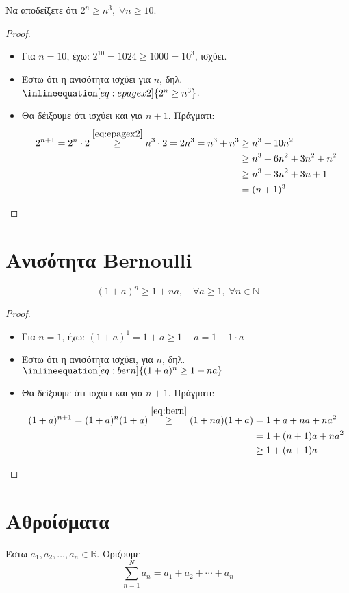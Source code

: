 \documentclass[main.tex]{subfiles}
\begin{document}
\begin{example}
    Να αποδείξετε ότι $ 2^{n} \geq n^{3}, \; \forall n \geq 10 $.
    \begin{proof}
    \item {}
        \begin{itemize}
            \item Για $ n=10 $, έχω: $ 2^{10} = 1024 \geq 1000 = 10^{3}  $, 
                ισχύει.
            \item Έστω ότι η ανισότητα ισχύει για $n$, δηλ. 
                $\inlineequation[eq:epagex2]{2^{n} \geq n^{3}}$.
            \item Θα δέιξουμε ότι ισχύει και για $ n+1 $. Πράγματι:
               \begin{align*}
                   2^{n+1} = 2^{n} \cdot 2 \overset{\eqref{eq:epagex2}}{\geq} n^{3} 
                   \cdot 2 = 2n^{3} = n^{3} + n^{3} &\geq n^{3} + 10n^{2} \\
                                 &\geq n^{3} + 6n^{2} + 3n^{2} + n^{2} \\ 
                                 &\geq n^{3} + 3n^{2} + 3n + 1 \\ 
                                 &= (n+1)^{3}
               \end{align*} 
        \end{itemize}
    \end{proof}
\end{example}

\section{Ανισότητα Bernoulli}
\[
    \boxed{(1+a)^{n} \geq 1 + na, \quad \forall a \geq 1, \; \forall n \in
    \mathbb{N}}
 \] 
 \begin{proof}
     \begin{itemize}
         \item Για $ n=1 $, έχω: $ (1+a)^{1} = 1+a \geq 1+a = 1 + 1 \cdot a $
         \item Έστω ότι η ανισότητα ισχύει, για $ n $, δηλ. $\inlineequation[eq:bern]
             {(1+a)^{n} \geq 1 + na}$
         \item Θα δείξουμε ότι ισχύει και για $ n+1 $. Πράγματι:
             \begin{align*}
                 (1+a)^{n+1} = (1+a)^{n}(1+a) \overset{\eqref{eq:bern}}{\geq} 
                 (1+na)(1+a) &= 1 + a + na + na^{2} \\
                             &= 1 + (n+1)a + na^{2} \\
                             &\geq 1 + (n+1)a
             \end{align*}

     \end{itemize}
 \end{proof}

\section{Αθροίσματα}

\begin{dfn}
    Έστω $ a_{1}, a_{2}, \ldots, a_{n} \in \mathbb{R} $. Ορίζουμε 
    \[ \sum_{n=1}^{N} a_{n} = a_{1} + a_{2} + \cdots + a_{n} \]
\end{dfn}
\end{document}
